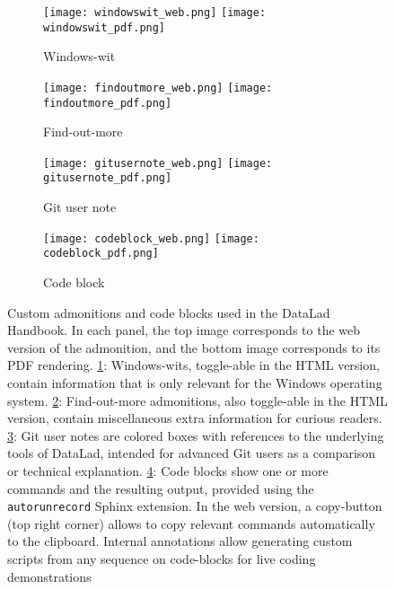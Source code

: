 \begin{figure}
	\hfill
	\begin{subfigure}{.44\textwidth}
	\texttt{[image: windowswit\_web.png]}
	\texttt{[image: windowswit\_pdf.png]}
	\caption{Windows-wit}
	\label{fig:handbook-windowswit}
	\end{subfigure}
	\begin{subfigure}{.55\textwidth}
		\texttt{[image: findoutmore\_web.png]}
		\texttt{[image: findoutmore\_pdf.png]}
		\caption{Find-out-more}
		\label{fig:handbook-findoutmore}
	\end{subfigure}
	\hfill
	\begin{subfigure}{.44\textwidth}
	\texttt{[image: gitusernote\_web.png]}
	\texttt{[image: gitusernote\_pdf.png]}
	\caption{Git user note}
	\label{fig:handbook-gitusernote}
	\end{subfigure}
	\hfill
	\begin{subfigure}{.55\textwidth}
	\texttt{[image: codeblock\_web.png]}
	\texttt{[image: codeblock\_pdf.png]}
	\caption{Code block}
	\label{fig:handbook-codeblock}
    \end{subfigure}
	\caption{Custom admonitions and code blocks used in the DataLad Handbook. In each panel, the top image corresponds to the web version of the admonition, and the bottom image corresponds to its PDF rendering.
	\ref{fig:handbook-windowswit}: Windows-wits, toggle-able in the HTML version, contain information that is only relevant for the Windows operating system. \ref{fig:handbook-findoutmore}: Find-out-more admonitions, also toggle-able in the HTML version, contain miscellaneous extra information for curious readers. \ref{fig:handbook-gitusernote}: Git user notes are colored boxes with references to the underlying tools of DataLad, intended for advanced Git users as a comparison or technical explanation.  \ref{fig:handbook-codeblock}: Code blocks show one or more commands and the resulting output, provided using the \texttt{autorunrecord} Sphinx extension. In the web version, a copy-button (top right corner) allows to copy relevant commands automatically to the clipboard. Internal annotations allow generating custom scripts from any sequence on code-blocks for live coding demonstrations}
	\label{fig:handbook-admonitions}
\end{figure}

